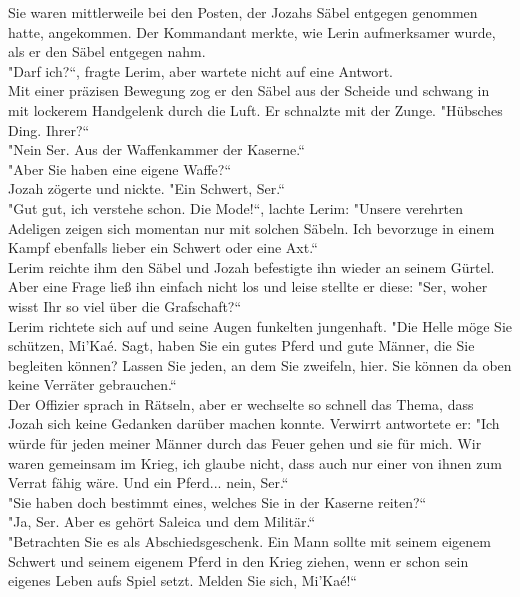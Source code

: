 Sie waren mittlerweile bei den Posten, der Jozahs Säbel entgegen genommen hatte, angekommen. Der 
Kommandant merkte, wie Lerin aufmerksamer wurde, als er den Säbel entgegen nahm.\\
"Darf ich?``, fragte Lerim, aber wartete nicht auf eine Antwort.\\
Mit einer präzisen Bewegung zog er den Säbel aus der Scheide und schwang in mit lockerem Handgelenk 
durch die Luft. Er schnalzte mit der Zunge. "Hübsches Ding. Ihrer?``\\
"Nein Ser. Aus der Waffenkammer der Kaserne.``\\
"Aber Sie haben eine eigene Waffe?``\\
Jozah zögerte und nickte. "Ein Schwert, Ser.``\\
"Gut gut, ich verstehe schon. Die Mode!``, lachte Lerim: "Unsere verehrten Adeligen zeigen sich 
momentan nur mit solchen Säbeln. Ich bevorzuge in einem Kampf ebenfalls lieber ein Schwert oder 
eine Axt.``\\
Lerim reichte ihm den Säbel und Jozah befestigte ihn wieder an seinem Gürtel. Aber eine Frage ließ 
ihn einfach nicht los und leise stellte er diese: "Ser, woher wisst Ihr so viel über die 
Grafschaft?``\\
Lerim richtete sich auf und seine Augen funkelten jungenhaft. "Die Helle möge Sie schützen, Mi'Kaé. 
Sagt, haben Sie ein gutes Pferd und gute Männer, die Sie begleiten  können? Lassen Sie jeden, an 
dem Sie zweifeln, hier. Sie können da oben keine Verräter gebrauchen.``\\
Der Offizier sprach in Rätseln, aber er wechselte so schnell das Thema, dass Jozah sich keine 
Gedanken darüber machen konnte. Verwirrt antwortete er: "Ich würde für jeden meiner Männer durch 
das Feuer gehen und sie für mich. Wir waren gemeinsam im Krieg, ich glaube nicht, dass auch nur 
einer von ihnen zum Verrat fähig wäre. Und ein Pferd... nein, Ser.``\\
"Sie haben doch bestimmt eines, welches Sie in der Kaserne reiten?``\\
"Ja, Ser. Aber es gehört Saleica und dem Militär.``\\
"Betrachten Sie es als Abschiedsgeschenk. Ein Mann sollte mit seinem eigenem Schwert und seinem 
eigenem Pferd in den Krieg ziehen, wenn er schon sein eigenes Leben aufs Spiel setzt. Melden Sie 
sich, Mi'Kaé!`` \\


